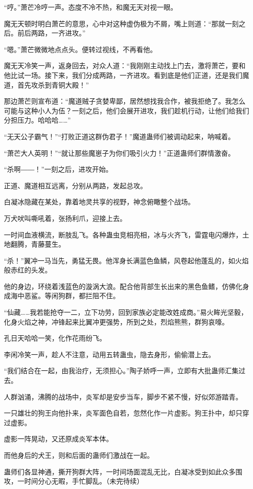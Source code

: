 \begin{this_body}
“哼。”萧芒冷哼一声。态度不冷不热，和魔无天对视一眼。

魔无天顿时明白萧芒的意思，心中对这种虚伪极为不屑，嘴上则道：“那就一刻之后。前后两路，一齐进攻。”

“嗯。”萧芒微微地点点头。便转过视线，不再看他。

魔无天冷笑一声，返身回去，对众人道：“我刚刚主动找上门去，激将萧芒，要和他比试一场。接下来，我们分成两路，一齐进攻。看到底是他们正道，还是我们魔道，首先攻杀到青铜大殿！”

那边萧芒则宣布道：“魔道贼子贪婪卑鄙，居然想找我合作，被我拒绝了。我怎么可能与这种小人为伍？一刻之后，他们会展开进攻，我们趁机行动，让他们给我们分担压力。哈哈哈……”

“无天公子霸气！”“打败正道这群伪君子！”魔道蛊师们被调动起来，呐喊着。

“萧芒大人英明！”“就让那些魔崽子为你们吸引火力！”正道蛊师们群情激奋。

“杀啊――！”一刻之后，进攻开始。

正道、魔道相互远离，分别从两路，发起总攻。

白凝冰隐藏在某处，靠着地灵共享的视野，神念俯瞰整个战场。

万犬吠叫嘶吼着，张扬利爪，迎接上去。

一时间血液横流，断肢乱飞。各种蛊虫竞相亮相，冰与火齐飞，雷霆电闪爆炸，土地翻腾，青藤蔓生。

“杀！”翼冲一马当先，勇猛无畏。他浑身长满蓝色鱼鳞，风卷起他蓬乱的，如火焰般赤红的头发。

他的身边，环绕着浅蓝色的漩涡大浪。配合他背部生长出来的黑色鱼鳍，仿佛化身成海中恶鲨。等闲狗群，都拦阻不住。

“仙藏……我若能抢夺一二，立下功劳，回到家族必定能改姓成商。”易火眸光坚毅，化身火焰之神，冲锋起来比翼冲更强势，所到之处，烈焰熊熊，群狗哀嚎。

孔日天哈哈一笑，化作花雨纷飞。

李闲冷笑一声，趁人不注意，动用五转蛊虫，隐去身形，偷偷潜上去。

“我们结合在一起，由我治疗，无须担心。”陶子娇呼一声，立即有大批蛊师汇集过去。

人群汹涌，沸腾的战场中，炎军却是安步当车，脚步不紧不慢，好似郊游踏青。

一只雄壮的狗王向他扑来，炎军面色自若，忽然化作一片虚影。狗王扑中，却只穿过虚影。

虚影一阵晃动，又还原成炎军本体。

而他身后的犬王，则和后面的蛊师们激战在一起。

蛊师们各显神通，撕开狗群大阵，一时间场面混乱无比，白凝冰受到如此众多围攻，一时间分心无暇，手忙脚乱。（未完待续）

\end{this_body}

